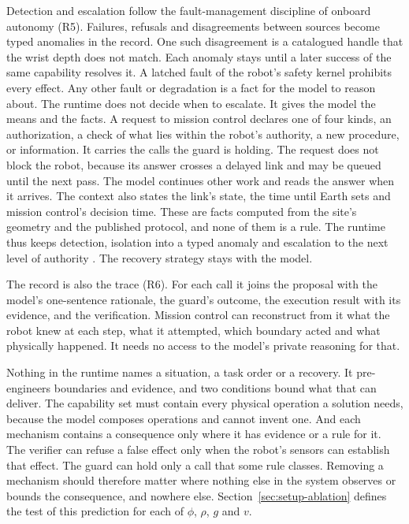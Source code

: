 Detection and escalation follow the fault-management discipline of onboard autonomy (R5). Failures, refusals and
disagreements between sources become typed anomalies in the record. One such disagreement is a catalogued handle that
the wrist depth does not match. Each anomaly stays until a later success of the same capability resolves it. A latched
fault of the robot's safety kernel prohibits every effect. Any other fault or degradation is a fact for the model to
reason about. The runtime does not decide when to escalate. It gives the model the means and the facts. A request to
mission control declares one of four kinds, an authorization, a check of what lies within the robot's authority, a new
procedure, or information. It carries the calls the guard is holding. The request does not block the robot, because its
answer crosses a delayed link and may be queued until the next pass. The model continues other work and reads the
answer when it arrives. The context also states the link's state, the time until Earth sets and mission control's
decision time. These are facts computed from the site's geometry and the published protocol, and none of them is a
rule. The runtime thus keeps detection, isolation into a typed anomaly and escalation to the next level of authority
\citep{ecss2008operability}. The recovery strategy stays with the model.

The record is also the trace (R6). For each call it joins the proposal with the model's one-sentence rationale, the
guard's outcome, the execution result with its evidence, and the verification. Mission control can reconstruct from it
what the robot knew at each step, what it attempted, which boundary acted and what physically happened. It needs no
access to the model's private reasoning for that.

Nothing in the runtime names a situation, a task order or a recovery. It pre-engineers boundaries and evidence, and two
conditions bound what that can deliver. The capability set must contain every physical operation a solution needs,
because the model composes operations and cannot invent one. And each mechanism contains a consequence only where it
has evidence or a rule for it. The verifier can refuse a false effect only when the robot's sensors can establish that
effect. The guard can hold only a call that some rule classes. Removing a mechanism should therefore matter where
nothing else in the system observes or bounds the consequence, and nowhere else. Section~\ref{sec:setup-ablation}
defines the test of this prediction for each of $\phi$, $\rho$, $g$ and $v$.

